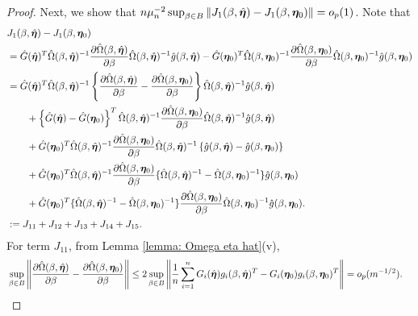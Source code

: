 \documentclass[12pt]{article}
\begin{document}
{\begin{proof}
Next, we show that $n\mu_n^{-2} \sup_{\beta\in B} \|J_1(\beta, \hat {\bm \eta})- J_1(\beta, \bm \eta_0)\|= o_p(1)$. Note that 
\begin{align*}
	&J_1(\beta, \hat{\bm \eta})- 	J_1(\beta, \bm \eta_0) \\
	&=  \hat G (\hat {\bm \eta})^T  \hat \Omega(\beta, \hat{\bm \eta})^{-1} \frac{\partial \hat\Omega(\beta,\hat {\bm \eta})}{\partial \beta}  \hat \Omega(\beta, \hat{\bm \eta})^{-1}\hat g(\beta, \hat{\bm \eta}) - \hat G (\bm \eta_0)^T  \hat \Omega(\beta, \bm \eta_0)^{-1} \frac{\partial \hat\Omega(\beta, \bm \eta_0)}{\partial \beta}  \hat \Omega(\beta, \bm \eta_0)^{-1}\hat g(\beta, \bm \eta_0) \\
	&= \hat G(\hat {\bm \eta})^T    \hat\Omega(\beta, \hat{\bm \eta})^{-1} \left\{ \frac{\partial \hat \Omega(\beta, \hat {\bm \eta})}{\partial \beta} -  \frac{\partial \hat\Omega(\beta, \bm \eta_0)}{\partial \beta} \right\}    \hat\Omega(\beta, \hat{\bm \eta})^{-1} \hat g(\beta, \hat{\bm \eta})\\
	&\qquad + \left\{ \hat G(\hat {\bm \eta}) - \hat G(\bm \eta_0) \right\}^T   \hat\Omega(\beta, \hat{\bm \eta})^{-1}   \frac{\partial \hat\Omega(\beta, \bm \eta_0)}{\partial \beta}  \hat\Omega(\beta, \hat{\bm \eta})^{-1} \hat g(\beta, \hat{\bm \eta})\\
	&\qquad+  \hat G(\bm \eta_0) ^T   \hat\Omega(\beta, \hat{\bm \eta})^{-1}   \frac{\partial \hat\Omega(\beta, \bm \eta_0)}{\partial \beta}  \hat\Omega(\beta, \hat{\bm \eta})^{-1}  \left\{\hat g(\beta, \hat{\bm \eta}) - \hat g(\beta, \bm \eta_0) \right\}\\
	& \qquad+  \hat G(\bm \eta_0) ^T   \hat\Omega(\beta, \hat{\bm \eta})^{-1}   \frac{\partial \hat\Omega(\beta, \bm \eta_0)}{\partial \beta}  \{\hat\Omega(\beta, \hat{\bm \eta})^{-1} - \hat\Omega(\beta, \bm \eta_0)^{-1}\}  \hat g(\beta, \bm \eta_0) \\
	&\qquad + \hat G(\bm \eta_0) ^T   \{\hat\Omega(\beta, \hat{\bm \eta})^{-1} - \hat\Omega(\beta, \bm \eta_0)^{-1}\}   \frac{\partial \hat\Omega(\beta, \bm \eta_0)}{\partial \beta}  \hat\Omega(\beta, \bm \eta_0)^{-1}   \hat g(\beta, \bm \eta_0). \\
	&: = J_{11} + J_{12} + J_{13} + J_{14} + J_{15}. 
\end{align*}
For term $ J_{11} $, from Lemma \ref{lemma: Omega eta hat}(v), 
\begin{align*}
	&\sup_{\beta\in B}\left\|  \frac{\partial \hat \Omega(\beta, \hat \bfeta)}{\partial \beta} -  \frac{\partial \hat\Omega(\beta, \bfeta_0)}{\partial \beta}   \right\|\leq 2\sup_{\beta\in B} \left\| \frac1n \sum_{i=1}^{n} G_i(\hat\bfeta) g_i(\beta, \hat\bfeta)^T - G_i(\bfeta_0) g_i(\beta, \bfeta_0)^T   \right\| = o_p(m^{-1/2}).

\end{align*}
\end{proof}}
\end{document}
